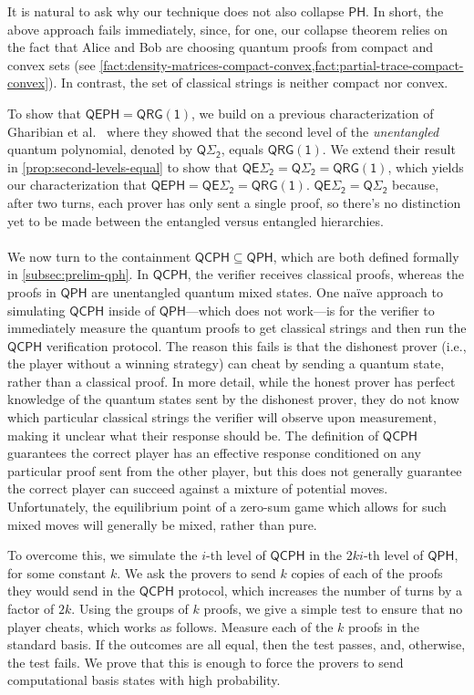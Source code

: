 \documentclass[11pt]{article}
\theoremstyle{definition}
\newcommand{\class}[1]{\ensuremath{\mathsf{#1}}\xspace}
\newcommand{\QRGk}[1][k]{\class{QRG(#1)}}
\newcommand{\QRGone}{\QRGk[1]}
\newcommand{\PH}{\class{PH}}
\newcommand{\QCPH}{\class{QCPH}}
\newcommand{\QPH}{\class{QPH}}
\newcommand{\QSigmai}[1][i]{\class{Q\Sigma_{#1}}}
\newcommand{\QEPH}{\class{QEPH}}
\newcommand{\entQSigmai}[1][i]{\class{QE\Sigma_{#1}}}
\begin{document}
It is natural to ask why 
our technique does not also collapse $\PH$. In short, the above approach fails immediately, since, for one, our collapse theorem relies on the fact that Alice and Bob are choosing quantum proofs from compact and convex sets (see \cref{fact:density-matrices-compact-convex,fact:partial-trace-compact-convex}). 
In contrast, the set of classical strings is neither compact nor convex. 

To show that $\QEPH = \QRGone$, we build on a previous characterization of Gharibian et al.\ \cite{GSSSY22_qph} where they showed that the second level of the \emph{unentangled} quantum polynomial, denoted by $\QSigmai[2]$, equals $\QRGone$. 
We extend their result in \cref{prop:second-levels-equal} to show that $\entQSigmai[2] = \QSigmai[2]=\QRGone$, which yields our characterization that $\QEPH = \entQSigmai[2]=\QRGone$. 
$\entQSigmai[2] = \QSigmai[2]$ because, after two turns, each prover has only sent a single proof, so there's no distinction yet to be made between the entangled versus entangled hierarchies.  


\paragraph{}
We now turn to the containment $\QCPH \subseteq \QPH$, which are both defined formally in \cref{subsec:prelim-qph}.
In $\QCPH$, the verifier receives classical proofs, whereas the proofs in $\QPH$ are unentangled quantum mixed states.
One na\"ive approach to simulating $\QCPH$ inside of $\QPH$---which does not work---is for the verifier to immediately measure the quantum proofs to get classical strings and then run the $\QCPH$ verification protocol. 
The reason this fails is that the dishonest prover (i.e., the player without a winning strategy) can cheat by sending a quantum state, rather than a classical proof. 
In more detail, while the honest prover has perfect knowledge of the quantum states sent by the dishonest prover, they do not know which particular classical strings the verifier will observe upon measurement, making it unclear what their response should be.
The definition of $\QCPH$ guarantees the correct player has an effective response conditioned on any particular proof sent from the other player, but this does not generally guarantee the correct player can succeed against a mixture of potential moves.
Unfortunately, the equilibrium point of a zero-sum game which allows for such mixed moves will generally be mixed, rather than pure.

To overcome this, we simulate the $i$-th level of $\QCPH$ in the $2ki$-th level of $\QPH$, for some constant $k$. 
We ask the provers to send $k$ copies of each of the proofs they would send in the $\QCPH$ protocol, which increases the number of turns by a factor of $2k$. 
Using the groups of $k$ proofs, we give a simple test to ensure that no player cheats, which works as follows. 
Measure each of the $k$ proofs in the standard basis. 
If the outcomes are all equal, then the test passes, and, otherwise, the test fails. 
We prove that this is enough to force the provers to send computational basis states with high probability. 
\end{document}

